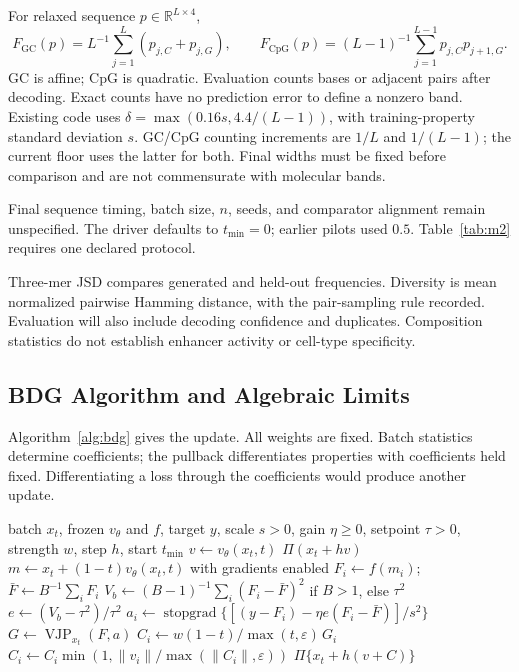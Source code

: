 \documentclass{article}
\newcommand{\Fbar}{\bar F}
\newcommand{\Vb}{V_b}
\newcommand{\sg}{\operatorname{stopgrad}}
\begin{document}
For relaxed sequence $p\in\mathbb R^{L\times4}$,
\[
F_{\mathrm{GC}}(p)=L^{-1}\sum_{j=1}^L(p_{j,C}+p_{j,G}),\qquad
F_{\mathrm{CpG}}(p)=(L-1)^{-1}\sum_{j=1}^{L-1}p_{j,C}p_{j+1,G}.
\]
GC is affine; CpG is quadratic. Evaluation counts bases or adjacent pairs after decoding. Exact counts have no prediction error to define a nonzero band. Existing code uses $\delta=\max(0.16s,4.4/(L-1))$, with training-property standard deviation $s$. GC/CpG counting increments are $1/L$ and $1/(L-1)$; the current floor uses the latter for both. Final widths must be fixed before comparison and are not commensurate with molecular bands.

Final sequence timing, batch size, $n$, seeds, and comparator alignment remain unspecified. The driver defaults to $t_{\min}=0$; earlier pilots used $0.5$. Table~\ref{tab:m2} requires one declared protocol.

Three-mer JSD compares generated and held-out frequencies. Diversity is mean normalized pairwise Hamming distance, with the pair-sampling rule recorded. Evaluation will also include decoding confidence and duplicates. Composition statistics do not establish enhancer activity or cell-type specificity.

\subsection{BDG Algorithm and Algebraic Limits}
Algorithm~\ref{alg:bdg} gives the update. All weights are fixed. Batch statistics determine coefficients; the pullback differentiates properties with coefficients held fixed. Differentiating a loss through the coefficients would produce another update.

\begin{algorithm}[htbp]
\caption{One BDG-guided Euler step}\label{alg:bdg}
\begin{algorithmic}[1]
\Require batch $x_t$, frozen $v_\theta$ and $f$, target $y$, scale $s>0$, gain $\eta\ge0$, setpoint $\tau>0$, strength $w$, step $h$, start $t_{\min}$
\State $v\gets v_\theta(x_t,t)$
 \State \Return $\Pi(x_t+h v)$ \EndIf
\State $m\gets x_t+(1-t)v_\theta(x_t,t)$ with gradients enabled
\State $F_i\gets f(m_i)$; $\Fbar\gets B^{-1}\sum_iF_i$
\State $\Vb\gets (B-1)^{-1}\sum_i(F_i-\Fbar)^2$ if $B>1$, else $\tau^2$
\State $e\gets(\Vb-\tau^2)/\tau^2$ 
\State $a_i\gets\sg\{[(y-F_i)-\eta e(F_i-\Fbar)]/s^2\}$
\State $G\gets\operatorname{VJP}_{x_t}(F,a)$
\State $C_i\gets w(1-t)/\max(t,\varepsilon)\,G_i$
\State $C_i\gets C_i\min(1,\|v_i\|/\max(\|C_i\|,\varepsilon))$
\State \Return $\Pi\{x_t+h(v+C)\}$
\end{algorithmic}
\end{algorithm}
\end{document}
